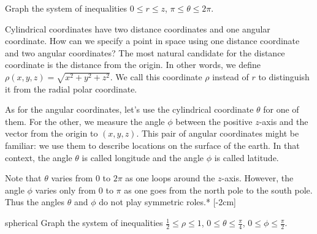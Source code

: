 \documentclass{watsonbook}
\begin{document}
\begin{exercise}{}{}
  Graph the system of inequalities $0 \leq r \leq z$, \: $\pi \leq \theta
  \leq 2\pi$. 
\end{exercise}

Cylindrical coordinates have two distance coordinates and one angular
coordinate. How can we specify a point in space using one distance
coordinate and two angular coordinates? The most natural candidate for
the distance coordinate is the distance from the origin. In other
words, we define $\rho(x,y,z) = \sqrt{x^2 + y^2 + z^2}$. We call this
coordinate $\rho$ instead of $r$ to distinguish it from the radial
polar coordinate.

As for the angular coordinates, let's use the cylindrical coordinate
$\theta$ for one of them. For the other, we measure the angle $\phi$
between the positive $z$-axis and the vector from the origin to
$(x,y,z)$. This pair of angular coordinates might be familiar: we use
them to describe locations on the surface of the earth. In that
context, the angle $\theta$ is called longitude and the angle $\phi$
is called latitude.

Note that $\theta$ varies from 0 to $2\pi$ as one loops around the
$z$-axis. However, the angle $\phi$ varies only from 0 to $\pi$ as one
goes from the north pole to the south pole. Thus the angles $\theta$
and $\phi$ do not play symmetric roles.* [-2cm]

\begin{example}{}{spherical}
  Graph the system of inequalities $\tfrac{1}{2} \leq \rho \leq 1$, \: $0
  \leq \theta \leq \tfrac{\pi}{4}$, \: $0 \leq \phi \leq \tfrac{\pi}{2}$. 
\end{example}
\end{document}
